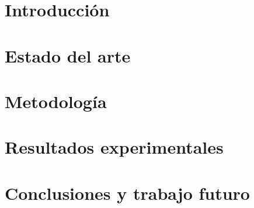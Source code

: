 \documentclass[12pt,a4paper]{article}
\begin{document}
\hypersetup{pageanchor=false}

\clearpage
\hypersetup{pageanchor=true}
\renewcommand{\totalpaginas}{\pageref*{LastRomanPage}}






\label{LastRomanPage}

\clearpage
{}
\renewcommand{\totalpaginas}{\pageref*{LastPage}}

\section{Introducción}
\label{sec:introduccion}


\section{Estado del arte}
\label{sec:estado-arte}


\section{Metodología}
\label{sec:metodologia}





\section{Resultados experimentales}
\label{sec:resultados}



\section{Conclusiones y trabajo futuro}
\label{sec:conclusiones}


\clearpage
\renewcommand{\refname}{Bibliografía}

{}


\label{anejo:comandos}


\label{anejo:codigo}


\label{anejo:telemetria}

\end{document}
